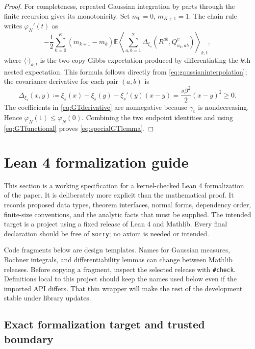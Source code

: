 \documentclass[11pt]{article}
\numberwithin{equation}{section}
\newcommand{\E}{\mathbb{E}}
\newcommand{\1}{\mathbf 1}
\begin{document}
\begin{proof}
For completeness, repeated Gaussian integration by parts through the
finite recursion gives its monotonicity.  Set $m_0=0$, $m_{K+1}=1$.
The chain rule writes $\varphi_N'(t)$ as
\begin{equation}
 -\frac12\sum_{k=0}^{K}(m_{k+1}-m_k)
 \E\left\langle
 \sum_{a,b=1}^2
 \Delta_{\xi_s}(R^{ab},Q^v_{u_k,ab})
 \right\rangle_{k,t},
 \label{eq:GTderivative}
\end{equation}
where $\langle\cdot\rangle_{k,t}$ is the two-copy Gibbs expectation
produced by differentiating the $k$th nested expectation.  This
formula follows directly from \eqref{eq:gaussianinterpolation}; the
covariance derivative for each pair $(a,b)$ is
\[
 \Delta_{\xi_s}(x,y)
 \coloneqq\xi_s(x)-\xi_s(y)-\xi_s'(y)(x-y)
 =\frac{s\beta^2}{2}(x-y)^2\ge0.
\]
The coefficients in \eqref{eq:GTderivative} are nonnegative because
$\gamma_v$ is nondecreasing.  Hence $\varphi_N(1)\le\varphi_N(0)$.
Combining the two endpoint identities and using
\eqref{eq:GTfunctional} proves \eqref{eq:specialGTlemma}.
\end{proof}

\section{Lean 4 formalization guide}
\label{app:lean-guide}

This section is a working specification for a kernel-checked Lean 4
formalization of the paper.  It is deliberately more explicit than the
mathematical proof.  It records proposed data types, theorem interfaces,
normal forms, dependency order, finite-size conventions, and the analytic
facts that must be supplied.  The intended target is a project using a
fixed release of Lean 4 and Mathlib.  Every final declaration should be
free of \texttt{sorry}; no axiom is needed or intended.

Code fragments below are design templates.  Names for Gaussian measures,
Bochner integrals, and differentiability lemmas can change between Mathlib
releases.  Before copying a fragment, inspect the selected release with
\texttt{\#check}.  Definitions local to this project should keep the names
used below even if the imported API differs.  That thin wrapper will make
the rest of the development stable under library updates.

\subsection{Exact formalization target and trusted boundary}
\end{document}
